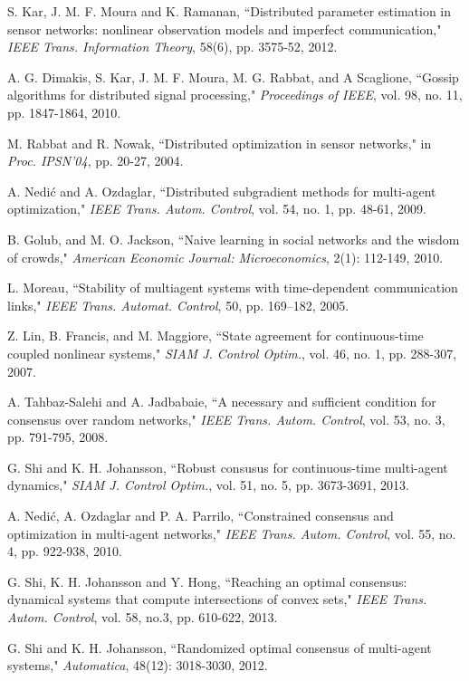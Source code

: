 \documentclass[a4paper, 11pt]{article}
\begin{document}
\begin{thebibliography}{99}
 S. Kar, J. M. F. Moura and K. Ramanan, ``Distributed parameter estimation in sensor networks:
nonlinear observation models and imperfect communication,"  {\em IEEE Trans.
Information Theory}, 58(6), pp. 3575-52, 2012.

 A. G. Dimakis,  S. Kar,
J. M. F. Moura,  M. G. Rabbat,  and
A Scaglione,  ``Gossip algorithms for
distributed signal processing,"  {\em Proceedings of IEEE}, vol. 98, no. 11, pp. 1847-1864, 2010.

 M. Rabbat and R. Nowak, ``Distributed optimization in sensor networks,"
in {\em Proc. IPSN’04},  pp. 20-27, 2004.

 A. Nedi\'{c} and A. Ozdaglar, ``Distributed subgradient methods for multi-agent optimization,"
{\em IEEE Trans. Autom. Control}, vol. 54, no. 1, pp. 48-61, 2009.

B. Golub,  and M. O. Jackson,  ``Naive learning in social networks
and the wisdom of crowds,"  {\em American Economic Journal: Microeconomics}, 2(1): 112-149, 2010.

 L. Moreau, ``Stability of multiagent systems with time-dependent communication links," {\em IEEE Trans. Automat. Control}, 50, pp. 169–182, 2005.

 Z. Lin, B. Francis, and M. Maggiore,
``State agreement for continuous-time coupled nonlinear systems," {\em SIAM J. Control Optim.}, vol. 46, no. 1, pp. 288-307, 2007.

 A. Tahbaz-Salehi and A. Jadbabaie, ``A necessary and sufficient condition
for consensus over random networks," {\em IEEE Trans. Autom. Control},
vol. 53, no. 3, pp. 791-795, 2008.

     G. Shi and K. H. Johansson, ``Robust consusus for continuous-time multi-agent dynamics," {\em SIAM J. Control Optim.}, vol. 51, no. 5, pp. 3673-3691, 2013.

 A. Nedi\'{c}, A. Ozdaglar and P. A. Parrilo, ``Constrained consensus and optimization in multi-agent networks," {\em IEEE Trans. Autom. Control}, vol. 55, no. 4, pp. 922-938, 2010.

 G. Shi, K. H. Johansson and Y. Hong,
``Reaching an optimal consensus: dynamical systems that compute intersections of convex sets," {\em IEEE Trans.
Autom. Control},  vol. 58, no.3, pp. 610-622,  2013.

 G. Shi and  K. H. Johansson, ``Randomized optimal consensus of multi-agent systems,"  {\em Automatica}, 48(12): 3018-3030, 2012.


\end{thebibliography}
\end{document}
